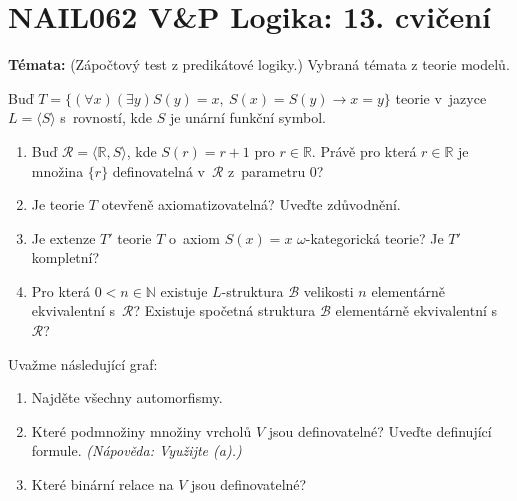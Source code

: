 \documentclass[a4paper,12pt]{article}
\begin{document}
\section*{NAIL062 V\&P Logika: 13. cvičení}

\textbf{Témata:}
(Zápočtový test z predikátové logiky.) Vybraná témata z teorie modelů.



\medskip\begin{problem}
    Buď $T=\{(\forall x)(\exists y) S(y)=x,\ S(x)=S(y)\to x=y\}$ teorie v~jazyce $L=\langle S\rangle$ s~rovností, kde $S$ je unární funkční symbol.
    \begin{enumerate}
    \item Buď $\mathcal{R}=\langle\mathbb{R},S\rangle$, kde $S(r)=r+1$ pro $r\in\mathbb{R}$. Právě pro která $r\in\mathbb{R}$ je množina $\{r\}$ definovatelná v~$\mathcal{R}$ z~parametru $0$?
    \item Je teorie $T$ otevřeně axiomatizovatelná? Uveďte zdůvodnění.
    \item Je extenze $T'$ teorie $T$ o~axiom $S(x)=x$ $\omega$-kategorická teorie? Je $T'$ kompletní?
    \item Pro která $0<n\in\mathbb{N}$ existuje $L$-struktura $\mathcal{B}$ velikosti $n$ elementárně ekvivalentní s~$\mathcal{R}$? Existuje spočetná struktura $\mathcal{B}$ elementárně ekvivalentní s~$\mathcal{R}$?
    \end{enumerate}
\end{problem}


\medskip\begin{problem}
Uvažme následující graf:

\begin{center}
\end{center}

    \begin{enumerate}
        \item Najděte všechny automorfismy.
        \item Které podmnožiny množiny vrcholů $V$ jsou definovatelné? Uveďte definující formule. {\it (Nápověda: Využijte (a).)}
        \item Které binární relace na $V$ jsou definovatelné?
    \end{enumerate} 





\end{problem}
\end{document}

